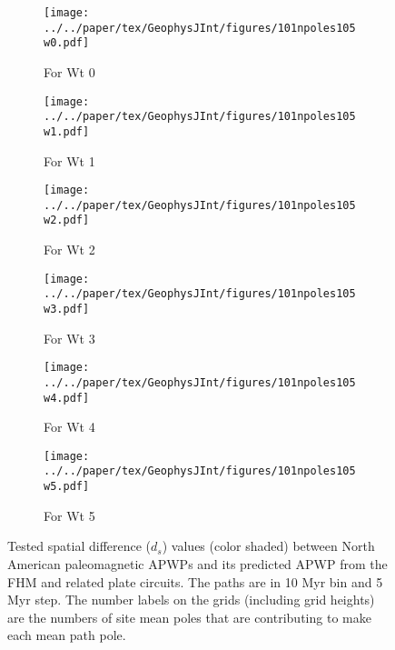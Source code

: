\begin{figure*}
	\centering
	\begin{subfigure}{.495\textwidth}
		\texttt{[image: ../../paper/tex/GeophysJInt/figures/101npoles105w0.pdf]}
		\caption{For Wt 0}\label{fig-na-dsw0}
	\end{subfigure}
	\vspace{.1em}
	\begin{subfigure}{.495\textwidth}
		\texttt{[image: ../../paper/tex/GeophysJInt/figures/101npoles105w1.pdf]}
		\caption{For Wt 1}\label{fig-na-dsw1}
	\end{subfigure}
	\vspace{.1em}
	\begin{subfigure}{.495\textwidth}
		\texttt{[image: ../../paper/tex/GeophysJInt/figures/101npoles105w2.pdf]}
		\caption{For Wt 2}\label{fig-na-dsw2}
	\end{subfigure}
	\vspace{.1em}
	\begin{subfigure}{.495\textwidth}
		\texttt{[image: ../../paper/tex/GeophysJInt/figures/101npoles105w3.pdf]}
		\caption{For Wt 3}\label{fig-na-dsw3}
	\end{subfigure}
	\vspace{.1em}
	\begin{subfigure}{.495\textwidth}
		\texttt{[image: ../../paper/tex/GeophysJInt/figures/101npoles105w4.pdf]}
		\caption{For Wt 4}\label{fig-na-dsw4}
	\end{subfigure}
	\vspace{.1em}
	\begin{subfigure}{.495\textwidth}
		\texttt{[image: ../../paper/tex/GeophysJInt/figures/101npoles105w5.pdf]}
		\caption{For Wt 5}\label{fig-na-dsw5}
	\end{subfigure}
	\caption[ds of each pair of poles for North American 10/5 Myr APWPs]{Tested
spatial difference ($d_s$) values (color shaded) between North American
paleomagnetic APWPs and its predicted APWP from the FHM and related plate
circuits. The paths are in 10 Myr bin and 5 Myr step. The number labels on the
grids (including grid heights) are the numbers of site mean poles that are
contributing to make each mean path pole.}\label{fig-nads}
\end{figure*}


